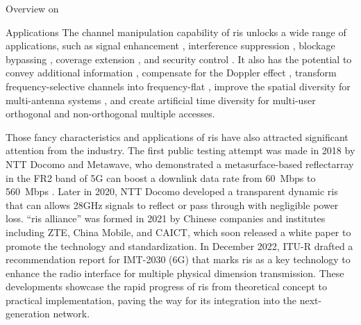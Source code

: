 \begin{section}{Overview on }
	\begin{subsection}{Applications}\label{sc:ris_applications}
		The channel manipulation capability of \gls{ris} unlocks a wide range of applications, such as signal enhancement \cite{Wu2019}, interference suppression \cite{Jiang2022}, blockage bypassing \cite{Ghatak2021}, coverage extension \cite{Zeng2021}, and security control \cite{Almohamad2020}.
		It also has the potential to convey additional information \cite{Ye2022}, compensate for the Doppler effect \cite{Basar2021}, transform frequency-selective channels into frequency-flat \cite{Arslan2022}, improve the spatial diversity for multi-antenna systems \cite{Ozdogan2020a}, and create artificial time diversity for multi-user orthogonal \cite{Yang2019} and non-orthogonal \cite{Chen2023} multiple accesses.

		Those fancy characteristics and applications of \gls{ris} have also attracted significant attention from the industry.
		The first public testing attempt was made in 2018 by NTT Docomo and Metawave, who demonstrated a metasurface-based reflectarray in the FR2 band of 5G can boost a downlink data rate from \qty{60}{Mbps} to \qty{560}{Mbps} \cite{Liu2022b}.
		Later in 2020, NTT Docomo developed a transparent dynamic \gls{ris} that can allows 28GHz signals to reflect or pass through with negligible power loss.
		``\gls{ris} alliance'' was formed in 2021 by Chinese companies and institutes including ZTE, China Mobile, and CAICT, which soon released a white paper \cite{Rista2023} to promote the technology and standardization.
		In December 2022, ITU-R drafted a recommendation report for IMT-2030 (6G) \cite{Itu2022} that marks \gls{ris} as a key technology to enhance the radio interface for multiple physical dimension transmission.
		These developments showcase the rapid progress of \gls{ris} from theoretical concept to practical implementation, paving the way for its integration into the next-generation network.
	\end{subsection}
\end{section}


